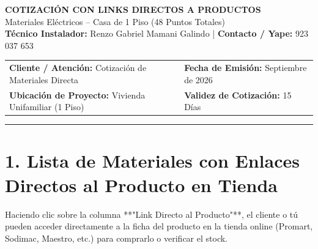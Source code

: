 \documentclass[11pt,a4paper]{article}
\begin{document}
\pagestyle{empty}

\begin{tcolorbox}[colback=DarkBlue,colframe=DarkBlue,arc=4pt]
    \color{white}
    \centering
    {\Huge \textbf{COTIZACIÓN CON LINKS DIRECTOS A PRODUCTOS}}\\[0.2cm]
    {\Large Materiales Eléctricos -- Casa de 1 Piso (48 Puntos Totales)}\\[0.1cm]
    \small \textbf{Técnico Instalador:} Renzo Gabriel Mamani Galindo | \textbf{Contacto / Yape:} 923 037 653
\end{tcolorbox}

\vspace{0.2cm}

\begin{tabularx}{\textwidth}{X X}
    \textbf{Cliente / Atención:} Cotización de Materiales Directa & \textbf{Fecha de Emisión:} Septiembre de 2026 \\
    \textbf{Ubicación de Proyecto:} Vivienda Unifamiliar (1 Piso) & \textbf{Validez de Cotización:} 15 Días \\
\end{tabularx}

\vspace{0.1cm}
\hrule
\vspace{0.2cm}

\section*{1. Lista de Materiales con Enlaces Directos al Producto en Tienda}

Haciendo clic sobre la columna **"Link Directo al Producto"**, el cliente o tú pueden acceder directamente a la ficha del producto en la tienda online (Promart, Sodimac, Maestro, etc.) para comprarlo o verificar el stock.
\end{document}
